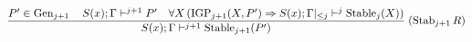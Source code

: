 \documentclass[preview]{standalone}
\begin{document}
\begin{align*}
\special{dvisvgm:raw <g id='unique000'>}\frac{P'\in\operatorname{Gen}_{j+1} \quad S(x);\Gamma \vdash^{j+1} P' \quad \forall X\, (\operatorname{IGP}_{j+1}(X, P') \Rightarrow S(x);\Gamma|_{\le j}\vdash^j \operatorname{Stable}_j(X))}{S(x);\Gamma \vdash^{j+1} \operatorname{Stable}_{j+1}(P')}\; (\operatorname{Stab}_{j+1}R)\special{dvisvgm:raw </g>}
\end{align*}
\end{document}
